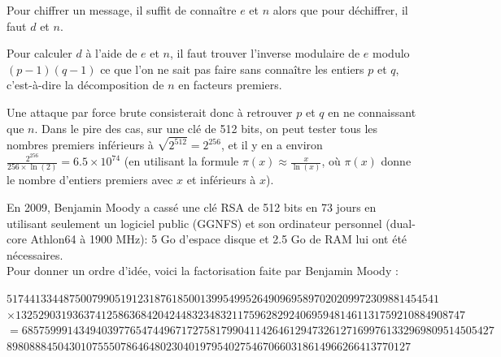 Pour chiffrer un message, il suffit de connaître $e$ et $n$ alors que pour déchiffrer, il faut $d$ et $n$. 

Pour calculer $d$ à l'aide de $e$ et $n$, il faut trouver l'inverse modulaire de $e$ modulo $(p - 1)(q - 1)$ ce que l'on ne sait pas faire sans connaître les entiers $p$ et $q$, c'est-à-dire la décomposition de $n$ en facteurs premiers. 

Une attaque par force brute consisterait donc à retrouver $p$ et $q$ en ne connaissant que $n$. Dans le pire des cas, sur une clé de 512 bits, on peut tester tous les nombres premiers inférieurs à $\sqrt{2^{512}} = 2^{256}$, et il y en a environ $\frac{2^{256}}{256 \times \ln(2)} = 6.5 \times 10^{74}$ (en utilisant la formule $\pi(x) \approx \frac{x}{\ln(x)}$, où $\pi(x)$ donne le nombre d'entiers premiers avec $x$ et inférieurs à $x$).

En 2009, Benjamin Moody a cassé une clé RSA de 512 bits en 73 jours en utilisant seulement un logiciel public (GGNFS) et son ordinateur personnel (dual-core Athlon64 à 1900 MHz): 5 Go d'espace disque et 2.5 Go de RAM lui ont été nécessaires. \\

Pour donner un ordre d'idée, voici la factorisation faite par Benjamin Moody : 

$5174413344875007990519123187618500139954995264909695897020209972309881454541 $\\ 
$ \times  1325290319363741258636842042448323483211759628292406959481461131759210884908747 $ \\
$ =  68575999143494039776547449671727581799041142646129473261271699761332969809514505427$\\
\indent $89808884504301075550786464802304019795402754670660318614966266413770127$






